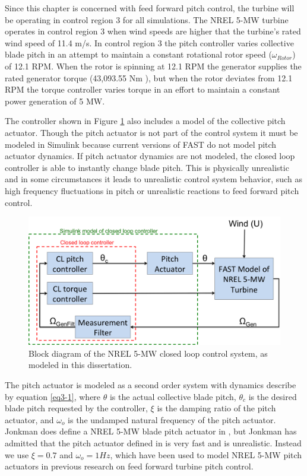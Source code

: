 Since this chapter is concerned with feed forward pitch control, the turbine will be operating in control region 3 for all simulations. The NREL 5-MW turbine operates in control region 3 when wind speeds are higher that the turbine's rated wind speed of 11.4 m/s. In control region 3 the pitch controller varies collective blade pitch in an attempt to maintain a constant rotational rotor speed ($\omega_{Rotor}$) of 12.1 RPM. When the rotor is spinning at 12.1 RPM the generator supplies the rated generator torque (43,093.55 Nm ), but when the rotor deviates from 12.1 RPM the torque controller varies torque in an effort to maintain a constant power generation of 5 MW. 

The controller shown in Figure \ref{fig3-9} also includes a model of the collective pitch actuator. Though the pitch actuator is not part of the control system it must be modeled in Simulink because current versions of FAST do not model pitch actuator dynamics. If pitch actuator dynamics are not modeled, the closed loop controller is able to instantly change blade pitch. This is physically unrealistic and in some circumstances it leads to unrealistic control system behavior, such as high frequency fluctuations in pitch or unrealistic reactions to feed forward pitch control.

 \begin{figure}[htb]
	\centering
		\includegraphics[width=\linewidth]{Figures/ch3Figures/fig3-9.png}
		
	\caption{Block diagram of the NREL 5-MW closed loop control system, as modeled in this dissertation.}
	\label{fig3-9}
\end{figure}

The pitch actuator is modeled as a second order system with dynamics describe by equation \ref{eq3-1}, where  $\theta$  is the actual collective blade pitch, $\theta_c$ is the desired blade pitch requested by the controller, $\xi$ is the damping ratio of the pitch actuator, and $\omega_o$ is the undamped natural frequency of the pitch actuator. Jonkman does define a NREL 5-MW blade pitch actuator in \cite{jonkman2009}, but Jonkman has admitted that the pitch actuator defined in \cite{jonkman2009} is very fast and is unrealistic.\cite{jonkman2014} Instead we use $\xi = 0.7$ and $\omega_o = 1Hz$, which have been used to model NREL 5-MW pitch actuators in previous research on feed forward turbine pitch control.\cite{dunne2011,dunne2012} 

